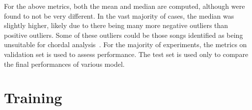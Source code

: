 For the above metrics, both the mean and median are computed, although were found to not be very different. In the vast majority of cases, the median was slightly higher, likely due to there being many more negative outliers than positive outliers. Some of these outliers could be those songs identified as being unsuitable for chordal analysis~\cite{FourTimelyInsights}. For the majority of experiments, the metrics on validation set is used to assess performance. The test set is used only to compare the final performances of various model.

\section{Training}